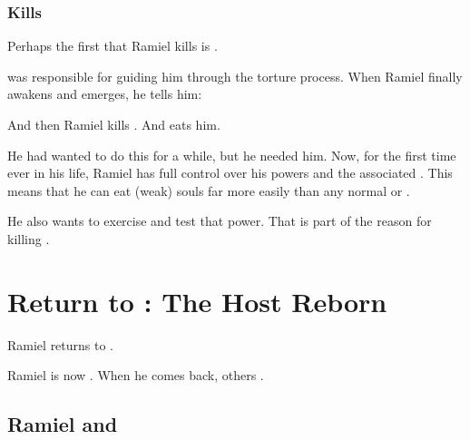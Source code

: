 \subsubsection{Kills \Gilchad}
Perhaps the first \resphan that Ramiel kills is \Gilchad. 

\Gilchad{} was responsible for guiding him through the torture process. 
When Ramiel finally awakens and emerges, he tells him: 

And then Ramiel kills \Gilchad. 
And eats him. 

He had wanted to do this for a while, but he needed him. 
Now, for the first time ever in his life, Ramiel has full control over his \Malach{} powers and the associated \carcer. 
This means that he can eat (weak) souls far more easily than any normal \resphan{} or \dragon. 

He also wants to exercise and test that power. 
That is part of the reason for killing \Gilchad. 















\section[Return to Mystraacht]{Return to \Mystraacht: The Host Reborn}
Ramiel returns to \Mystraacht. 


Ramiel is now .
When he comes back, others . 





\subsection{Ramiel and \Dasteron}





